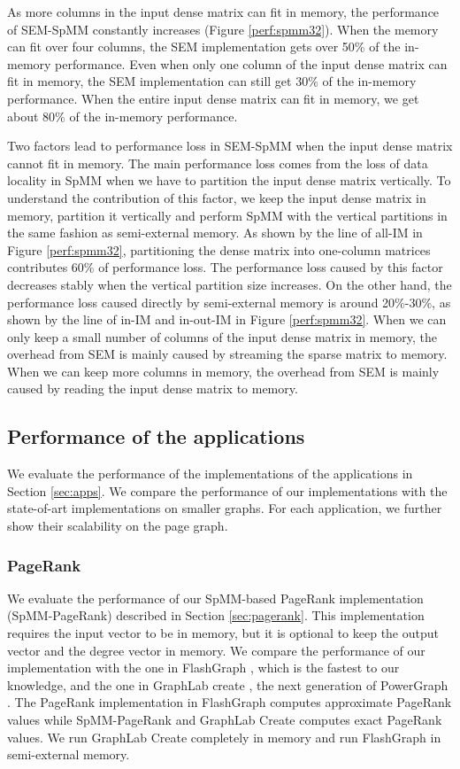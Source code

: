As more columns in the input dense matrix can fit in memory, the performance
of SEM-SpMM constantly increases (Figure \ref{perf:spmm32}). When the memory
can fit over four columns, the SEM implementation gets over 50\% of
the in-memory performance. Even when only one column of the input dense matrix
can fit in memory, the SEM implementation can still get 30\% of the in-memory
performance. When the entire input dense matrix can fit in memory, we get about
80\% of the in-memory performance.

Two factors lead to performance loss in SEM-SpMM when the input dense matrix
cannot fit in memory. The main performance loss comes from the loss of data
locality in SpMM when we have to partition the input dense matrix vertically.
To understand
the contribution of this factor, we keep the input dense matrix in memory,
partition it vertically and perform SpMM with the vertical partitions in
the same fashion as semi-external memory. As shown by the line of all-IM
in Figure \ref{perf:spmm32},
partitioning the dense matrix into one-column matrices contributes 60\%
of performance loss. The performance loss caused by this factor decreases
stably when the vertical partition size increases. On the other hand,
the performance loss caused directly by semi-external memory is around 20\%-30\%,
as shown by the line of in-IM and in-out-IM in Figure \ref{perf:spmm32}.
When we can only
keep a small number of columns of the input dense matrix in memory, the overhead
from SEM is mainly caused by streaming the sparse matrix to memory. When we can
keep more columns in memory, the overhead from SEM is mainly caused by reading
the input dense matrix to memory.

\subsection{Performance of the applications}

We evaluate the performance of the implementations of the applications in
Section \ref{sec:apps}. We compare the performance of our implementations
with the state-of-art implementations on smaller graphs. For each application,
we further show their scalability on the page graph.

\subsubsection{PageRank}
We evaluate the performance of our SpMM-based PageRank implementation
(SpMM-PageRank) described
in Section \ref{sec:pagerank}. This implementation requires the input vector
to be in memory, but it is optional to keep the output vector and the degree
vector in memory. We compare the performance of our implementation with
the one in FlashGraph \cite{flashgraph}, which is the fastest to our knowledge,
and the one in GraphLab create \cite{graphlab_create}, the next generation of
PowerGraph \cite{powergraph}. The PageRank implementation in FlashGraph computes
approximate PageRank values while SpMM-PageRank and GraphLab Create computes
exact PageRank values. We run GraphLab Create completely in memory and run
FlashGraph in semi-external memory.


